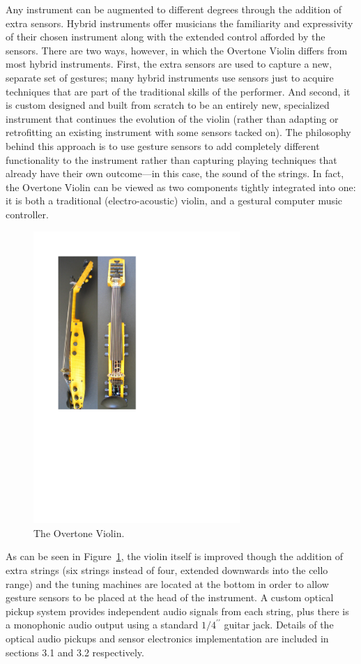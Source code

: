 Any instrument can be augmented to different degrees through the addition of
extra sensors. Hybrid instruments offer musicians the familiarity and
expressivity of their chosen instrument along with the extended control afforded
by the sensors. There are two ways, however, in which the Overtone Violin differs
from most hybrid instruments. First, the extra sensors are used to capture a new,
separate set of gestures; many hybrid instruments use sensors just to acquire
techniques that are part of the traditional skills of the performer. And second,
it is custom designed and built from scratch to be an entirely new, specialized
instrument that continues the evolution of the violin (rather than adapting or
retrofitting an existing instrument with some sensors tacked on). The philosophy
behind this approach is to use gesture sensors to add completely different
functionality to the instrument rather than capturing playing techniques that
already have their own outcome---in this case, the sound of the strings. In fact,
the Overtone Violin can be viewed as two components tightly integrated into one:
it is both a traditional (electro-acoustic) violin, and a gestural computer music
controller.

\begin{figure}[t]
\centering
\includegraphics[width=222pt]{img-1-eps-converted-to.pdf}
\caption{The Overtone Violin.}
\label{Overholt:fig:1} 
\end{figure}

As can be seen in Figure~\ref{Overholt:fig:1}, the violin itself is improved though the addition of
extra strings (six strings instead of four, extended downwards into the cello
range) and the tuning machines are located at the bottom in order to allow
gesture sensors to be placed at the head of the instrument. A custom optical
pickup system provides independent audio signals from each string, plus there is
a monophonic audio output using a standard $1/4^{\prime\prime}$ guitar jack.
Details of the optical audio pickups and sensor electronics implementation are
included in sections 3.1 and 3.2 respectively.

